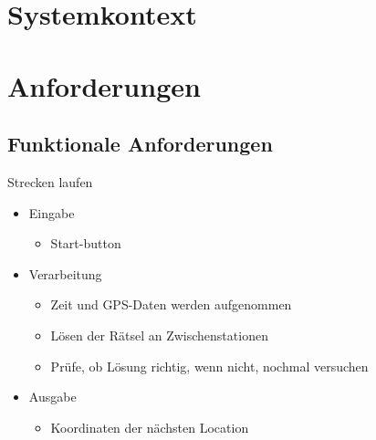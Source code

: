 \documentclass[a4paper, 12pt]{article}
\begin{document}
\section{Systemkontext}

\begin{figure}[H] 
\centering
	\fbox{\begin{minipage}{13cm} 
	\end{minipage}}

	
\end{figure}

\section{Anforderungen}
\subsection{Funktionale Anforderungen}
{\Large Strecken laufen}\\
\begin{itemize}
\item Eingabe
	\begin{itemize}
	\item Start-button
	\end{itemize}
\item Verarbeitung
	\begin{itemize}
	\item Zeit und GPS-Daten werden aufgenommen
	\item Lösen der Rätsel an Zwischenstationen
	\item Prüfe, ob Lösung richtig, wenn nicht, nochmal versuchen
	\end{itemize}
\item Ausgabe
	\begin{itemize}
	\item Koordinaten der nächsten Location
	\end{itemize}
\end{itemize}
\end{document}
